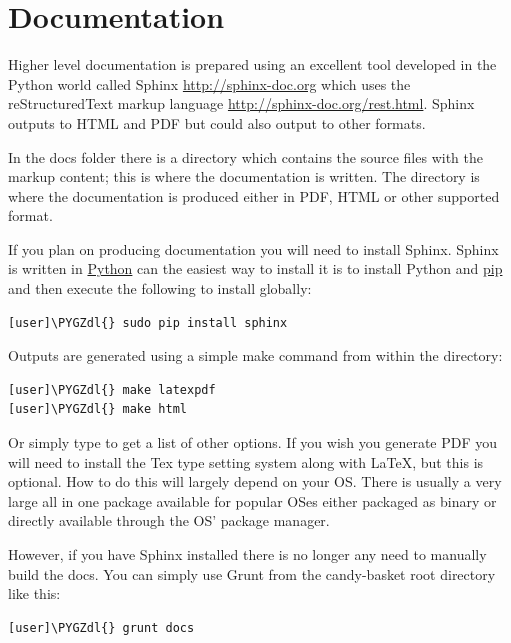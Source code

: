\documentclass[letterpaper,10pt,english]{sphinxmanual}
\def\PYGZdl{\char`\$}
\begin{document}
\section{Documentation}
\label{developer-guide:documentation}
Higher level documentation is prepared using an excellent tool
developed in the Python world called Sphinx \href{http://sphinx-doc.org}{http://sphinx-doc.org} which uses the reStructuredText markup
language \href{http://sphinx-doc.org/rest.html}{http://sphinx-doc.org/rest.html}. Sphinx outputs to HTML and PDF
but could also output to other formats.

In the docs folder there is a  directory which contains the
source files with the markup content; this is where the documentation
is written. The  directory is where the documentation is
produced either in PDF, HTML or other supported format.

If you plan on producing documentation you will need to install
Sphinx. Sphinx is written in \href{https://www.python.org/}{Python} can
the easiest way to install it is to install Python and \href{https://github.com/pypa/pip}{pip} and then execute the following to
install globally:

\begin{Verbatim}[commandchars=\\\{\}]
[user]\PYGZdl{} sudo pip install sphinx
\end{Verbatim}

Outputs are generated using a simple make command from within the
 directory:

\begin{Verbatim}[commandchars=\\\{\}]
[user]\PYGZdl{} make latexpdf
[user]\PYGZdl{} make html
\end{Verbatim}

Or simply type  to get a list of other options. If you wish
you generate PDF you will need to install the Tex type setting system
along with LaTeX, but this is optional. How to do this will largely
depend on your OS. There is usually a very large all in one package
available for popular OSes either packaged as binary or directly
available through the OS' package manager.

However, if you have Sphinx installed there is no longer any need to
manually build the docs. You can simply use Grunt from the
candy-basket root directory like this:

\begin{Verbatim}[commandchars=\\\{\}]
[user]\PYGZdl{} grunt docs
\end{Verbatim}
\end{document}
